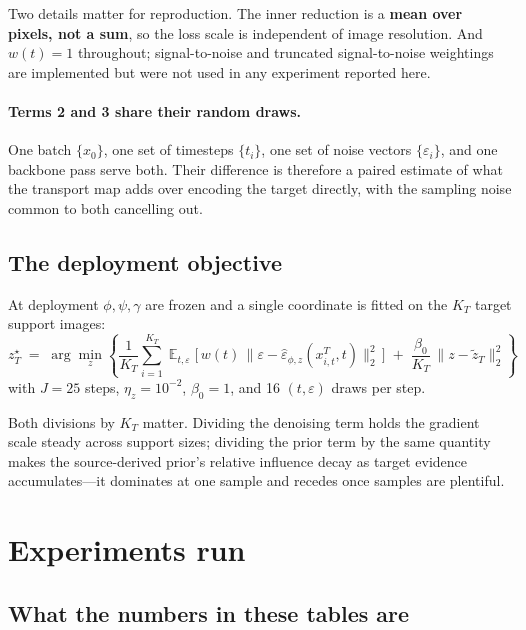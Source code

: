 \documentclass[11pt]{article}
\newcommand{\epshat}{\hat{\varepsilon}}
\newcommand{\ztilT}{\tilde{z}_{T}}
\newcommand{\zstarT}{z^{\star}_{T}}
\newcommand{\KT}{K_{T}}
\begin{document}
Two details matter for reproduction. The inner reduction is a \textbf{mean over pixels, not a
sum}, so the loss scale is independent of image resolution. And $w(t)=1$ throughout;
signal-to-noise and truncated signal-to-noise weightings are implemented but were not used in any
experiment reported here.

\paragraph{Terms 2 and 3 share their random draws.}
One batch $\{x_0\}$, one set of timesteps $\{t_i\}$, one set of noise vectors
$\{\varepsilon_i\}$, and one backbone pass serve both. Their difference is therefore a paired
estimate of what the transport map adds over encoding the target directly, with the sampling noise
common to both cancelling out.

\subsection{The deployment objective}

At deployment $\phi,\psi,\gamma$ are frozen and a single coordinate is fitted on the $\KT$ target
support images:
\begin{equation}
\zstarT \;=\; \arg\min_{z} \left\{
  \frac{1}{\KT}\sum_{i=1}^{\KT}
  \mathop{\mathbb{E}}_{t,\varepsilon}\Big[\, w(t)\,\big\| \varepsilon
    - \epshat_{\phi,z}(x^{T}_{i,t},t) \big\|_2^2 \,\Big]
  \;+\; \frac{\beta_0}{\KT}\,\big\| z - \ztilT \big\|_2^2
\right\}
\label{eq:refine}
\end{equation}
with $J=25$ steps, $\eta_z=10^{-2}$, $\beta_0=1$, and 16 $(t,\varepsilon)$ draws per step.

Both divisions by $\KT$ matter. Dividing the denoising term holds the gradient scale steady across
support sizes; dividing the prior term by the same quantity makes the source-derived prior's
relative influence decay as target evidence accumulates---it dominates at one sample and recedes
once samples are plentiful.

\section{Experiments run}
\label{sec:experiments}

\subsection{What the numbers in these tables are}
\end{document}
